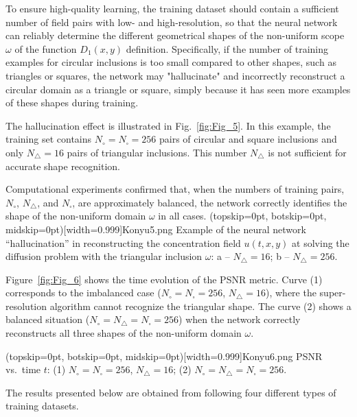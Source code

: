 \documentclass{ieeeaccess}
\begin{document}
To ensure high-quality learning, the training dataset should contain a sufficient number of field pairs with low- and high-resolution, so that the neural network can reliably determine the  different geometrical shapes of the non-uniform scope $\omega$ of the function $D_1(x,y)$ definition. 
Specifically, if the number of training examples for circular inclusions is too small compared to other shapes, such as triangles or squares, the network may "hallucinate" and incorrectly reconstruct a circular domain as a triangle or square, simply because it has seen more examples of these shapes during training.

The hallucination effect is illustrated in Fig.~\ref{fig:Fig_5}. 
In this example, the training set contains $N_\circ = N_\square = 256$  pairs of circular and square inclusions and only $N_\triangle = 16$ pairs of triangular inclusions. This number $N_\triangle$ is not sufficient for accurate shape recognition.

Computational experiments confirmed that, when the numbers of training pairs, $N_\circ$, $N_\triangle$, and $N_\square$, are approximately balanced, the network correctly identifies the shape of the non-uniform domain $\omega$ in all cases.
\Figure[ht!](topskip=0pt, botskip=0pt, midskip=0pt)[width=0.999\linewidth]{Konyu5.png}
{Example of the neural network ``hallucination'' in reconstructing the concentration field $u(t,x,y)$ at solving the diffusion problem with the  triangular inclusion $\omega$: a  --  $N_\triangle = 16$; b  --  $N_\triangle = 256$.
\label{fig:Fig_5}}

Figure~\ref{fig:Fig_6} shows the time evolution of the PSNR metric. Curve (1) corresponds to the imbalanced case ($N_\circ = N_\square = 256$, $N_\triangle = 16$), where the super-resolution algorithm cannot recognize the triangular shape. The curve (2) shows a balanced situation ($N_\circ = N_\triangle = N_\square = 256$) when the network correctly reconstructs all three shapes of the non-uniform domain  $\omega$.

\Figure[ht!](topskip=0pt, botskip=0pt, midskip=0pt)[width=0.999\linewidth]{Konyu6.png}
{PSNR vs.\ time $t$: (1) $N_\circ = N_\square = 256$, $N_\triangle = 16$; (2) $N_\circ = N_\triangle = N_\square = 256$.
\label{fig:Fig_6}}

The results presented below are obtained from following four different types of training datasets.
\end{document}
